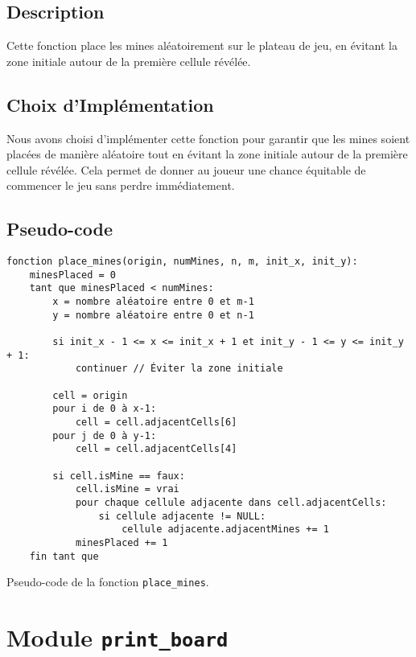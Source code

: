 \subsection{Description}

Cette fonction place les mines aléatoirement sur le plateau de jeu, en évitant la zone initiale autour de la première cellule révélée.



\subsection{Choix d'Implémentation}

Nous avons choisi d'implémenter cette fonction pour garantir que les mines soient placées de manière aléatoire tout en évitant la zone initiale autour de la première cellule révélée. 
Cela permet de donner au joueur une chance équitable de commencer le jeu sans perdre immédiatement.

\subsection{Pseudo-code}

\begin{listing}[!htpb]
    \begin{verbatim}
fonction place_mines(origin, numMines, n, m, init_x, init_y):
    minesPlaced = 0
    tant que minesPlaced < numMines:
        x = nombre aléatoire entre 0 et m-1
        y = nombre aléatoire entre 0 et n-1

        si init_x - 1 <= x <= init_x + 1 et init_y - 1 <= y <= init_y + 1:
            continuer // Éviter la zone initiale

        cell = origin
        pour i de 0 à x-1:
            cell = cell.adjacentCells[6]
        pour j de 0 à y-1:
            cell = cell.adjacentCells[4]

        si cell.isMine == faux:
            cell.isMine = vrai
            pour chaque cellule adjacente dans cell.adjacentCells:
                si cellule adjacente != NULL:
                    cellule adjacente.adjacentMines += 1
            minesPlaced += 1
    fin tant que
    \end{verbatim}
    \caption{Pseudo-code de la fonction \texttt{place\_mines}.}
\end{listing}

\newpage

\section{Module \texttt{print\_board}}
